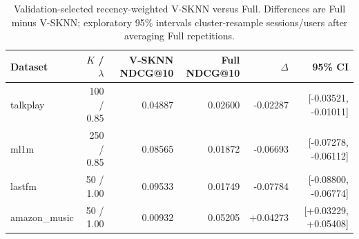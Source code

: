 \begin{table}[t]
\centering\scriptsize
\begin{tabular}{lrrrrr}
\toprule
Dataset & $K$ / $\lambda$ & V-SKNN NDCG@10 & Full NDCG@10 & $\Delta$ & 95\% CI \\
\midrule
talkplay & 100 / 0.85 & 0.04887 & 0.02600 & -0.02287 & [-0.03521, -0.01011] \\
ml1m & 250 / 0.85 & 0.08565 & 0.01872 & -0.06693 & [-0.07278, -0.06112] \\
lastfm & 50 / 1.00 & 0.09533 & 0.01749 & -0.07784 & [-0.08800, -0.06774] \\
amazon\_music & 50 / 1.00 & 0.00932 & 0.05205 & +0.04273 & [+0.03229, +0.05408] \\
\bottomrule
\end{tabular}
\caption{Validation-selected recency-weighted V-SKNN versus Full. Differences are Full minus V-SKNN; exploratory 95\% intervals cluster-resample sessions/users after averaging Full repetitions.}
\label{tab:ecir-vsknn}
\end{table}
